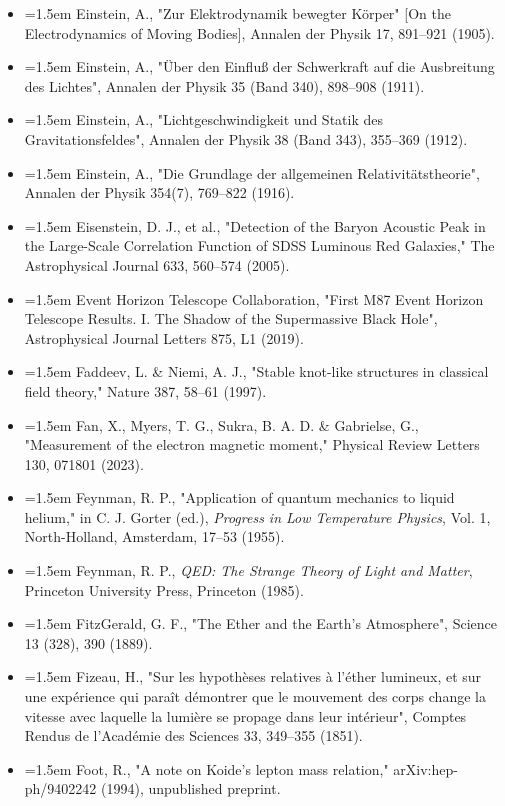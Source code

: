 \documentclass[11pt,a4paper]{article}
\begin{document}
\begin{itemize}[leftmargin=1.5em,label={}]
\item \hangindent=1.5em Einstein, A., "Zur Elektrodynamik bewegter Körper" [On the Electrodynamics of Moving Bodies], Annalen der Physik 17, 891–921 (1905).
\item \hangindent=1.5em Einstein, A., "Über den Einfluß der Schwerkraft auf die Ausbreitung des Lichtes", Annalen der Physik 35 (Band 340), 898–908 (1911).
\item \hangindent=1.5em Einstein, A., "Lichtgeschwindigkeit und Statik des Gravitationsfeldes", Annalen der Physik 38 (Band 343), 355–369 (1912).
\item \hangindent=1.5em Einstein, A., "Die Grundlage der allgemeinen Relativitätstheorie", Annalen der Physik 354(7), 769–822 (1916).
\item \hangindent=1.5em Eisenstein, D. J., et al., "Detection of the Baryon Acoustic Peak in the Large-Scale Correlation Function of SDSS Luminous Red Galaxies," The Astrophysical Journal 633, 560–574 (2005).
\item \hangindent=1.5em Event Horizon Telescope Collaboration, "First M87 Event Horizon Telescope Results. I. The Shadow of the Supermassive Black Hole", Astrophysical Journal Letters 875, L1 (2019).
\item \hangindent=1.5em Faddeev, L. \& Niemi, A. J., "Stable knot-like structures in classical field theory," Nature 387, 58–61 (1997).
\item \hangindent=1.5em Fan, X., Myers, T. G., Sukra, B. A. D. \& Gabrielse, G., "Measurement of the electron magnetic moment," Physical Review Letters 130, 071801 (2023).
\item \hangindent=1.5em Feynman, R. P., "Application of quantum mechanics to liquid helium," in C. J. Gorter (ed.), \emph{Progress in Low Temperature Physics}, Vol. 1, North-Holland, Amsterdam, 17–53 (1955).
\item \hangindent=1.5em Feynman, R. P., \emph{QED: The Strange Theory of Light and Matter}, Princeton University Press, Princeton (1985).
\item \hangindent=1.5em FitzGerald, G. F., "The Ether and the Earth's Atmosphere", Science 13 (328), 390 (1889).
\item \hangindent=1.5em Fizeau, H., "Sur les hypothèses relatives à l'éther lumineux, et sur une expérience qui paraît démontrer que le mouvement des corps change la vitesse avec laquelle la lumière se propage dans leur intérieur", Comptes Rendus de l'Académie des Sciences 33, 349–355 (1851).
\item \hangindent=1.5em Foot, R., "A note on Koide's lepton mass relation," arXiv:hep-ph/9402242 (1994), unpublished preprint.

\end{itemize}
\end{document}

